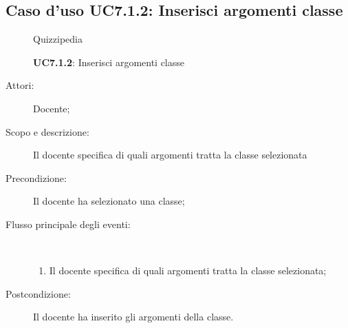 \subsection{Caso d'uso UC7.1.2: Inserisci argomenti classe}
	\begin{figure}[H]
		\centering
		\begin{resizedtikzpicture}{\textwidth}
		\begin{umlsystem}[x=0, fill=lightgray!20]{Quizzipedia}
		\end{umlsystem}
		\end{resizedtikzpicture}
		\caption{\textbf{UC7.1.2}: Inserisci argomenti classe}
		\label{UC7.1.2}
	\end{figure}
\begin{description}
\item[Attori:] Docente;
\item[Scopo e descrizione:] Il docente specifica di quali argomenti tratta la classe selezionata
      \item[Precondizione:] Il docente ha selezionato una classe;

        \item[Flusso principale degli eventi:] \ 
 \begin{enumerate}
          \item Il docente specifica di quali argomenti tratta la classe selezionata;

      \end{enumerate}
    \item[Postcondizione:] Il docente ha inserito gli argomenti della classe.
  \end{description}
\hypertarget{UC7.1.3}{}
